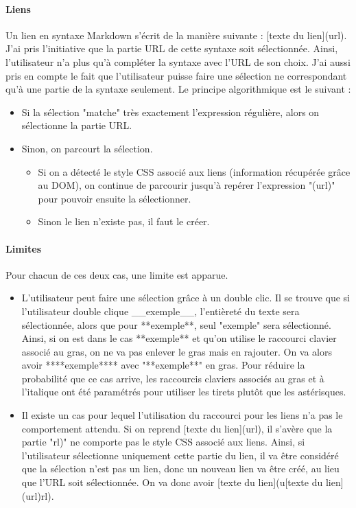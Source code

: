 \documentclass[12pt]{article}
\begin{document}
\paragraph{Liens}
Un lien en syntaxe Markdown s'écrit de la manière suivante : [texte du lien](url). J'ai pris l'initiative que la partie URL de cette syntaxe soit sélectionnée. Ainsi, l'utilisateur n'a plus qu'à compléter la syntaxe avec l'URL de son choix. J'ai aussi pris en compte le fait que l'utilisateur puisse faire une sélection ne correspondant qu'à une partie de la syntaxe seulement. Le principe algorithmique est le suivant :
\begin{itemize}
    \item Si la sélection "matche" très exactement l'expression régulière, alors on sélectionne la partie URL.
    \item Sinon, on parcourt la sélection.
        \begin{itemize}
            \item Si on a détecté le style CSS associé aux liens (information récupérée grâce au DOM), on continue de parcourir jusqu'à repérer l'expression "(url)" pour pouvoir ensuite la sélectionner.
            \item Sinon le lien n'existe pas, il faut le créer.
        \end{itemize}
\end{itemize}

\paragraph{Limites}
Pour chacun de ces deux cas, une limite est apparue.
\begin{itemize}
    \item L'utilisateur peut faire une sélection grâce à un double clic.  Il se trouve que si l'utilisateur double clique \_\_exemple\_\_, l'entièreté du texte sera sélectionnée, alors que pour **exemple**, seul "exemple" sera sélectionné. Ainsi, si on est dans le cas **exemple** et qu'on utilise le raccourci clavier associé au gras, on ne va pas enlever le gras mais en rajouter. On va alors avoir ****exemple**** avec "**exemple**" en gras. Pour réduire la probabilité que ce cas arrive, les raccourcis claviers associés au gras et à l'italique ont été paramétrés pour utiliser les tirets plutôt que les astérisques.
    \item Il existe un cas pour lequel l'utilisation du raccourci pour les liens n'a pas le comportement attendu. Si on reprend [texte du lien](url), il s'avère que la partie "rl)" ne comporte pas le style CSS associé aux liens. Ainsi, si l'utilisateur sélectionne uniquement cette partie du lien, il va être considéré que la sélection n'est pas un lien, donc un nouveau lien va être créé, au lieu que l'URL soit sélectionnée. On va donc avoir [texte du lien](u[texte du lien](url)rl).
\end{itemize}
\end{document}
